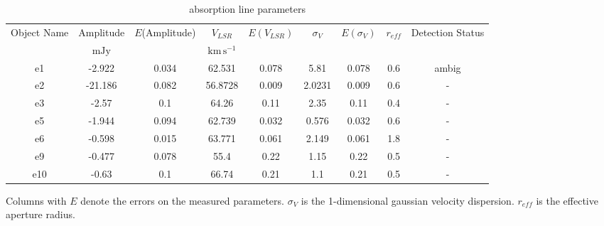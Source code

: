 \begin{table*}[htp]
\caption{\formaldehyde \twotwo absorption line parameters}
\begin{tabular}{ccccccccc}
\label{tab:absorption22}
Object Name & Amplitude & $E$(Amplitude) & $V_{LSR}$ & $E(V_{LSR})$ & $\sigma_V$ & $E(\sigma_V)$ & $r_{eff}$ & Detection Status \\
 & $\mathrm{mJy}$ &  & $\mathrm{km\,s^{-1}}$ &  &  &  &  &  \\
\hline
e1 & -2.922 & 0.034 & 62.531 & 0.078 & 5.81 & 0.078 & 0.6 & ambig \\
e2 & -21.186 & 0.082 & 56.8728 & 0.009 & 2.0231 & 0.009 & 0.6 & - \\
e3 & -2.57 & 0.1 & 64.26 & 0.11 & 2.35 & 0.11 & 0.4 & - \\
e5 & -1.944 & 0.094 & 62.739 & 0.032 & 0.576 & 0.032 & 0.6 & - \\
e6 & -0.598 & 0.015 & 63.771 & 0.061 & 2.149 & 0.061 & 1.8 & - \\
e9 & -0.477 & 0.078 & 55.4 & 0.22 & 1.15 & 0.22 & 0.5 & - \\
e10 & -0.63 & 0.1 & 66.74 & 0.21 & 1.1 & 0.21 & 0.5 & - \\
\hline
\end{tabular}
\par
Columns with $E$ denote the errors on the measured parameters.  $\sigma_{V}$ is the 1-dimensional gaussian velocity dispersion.  $r_{eff}$ is the effective aperture radius.
\end{table*}
